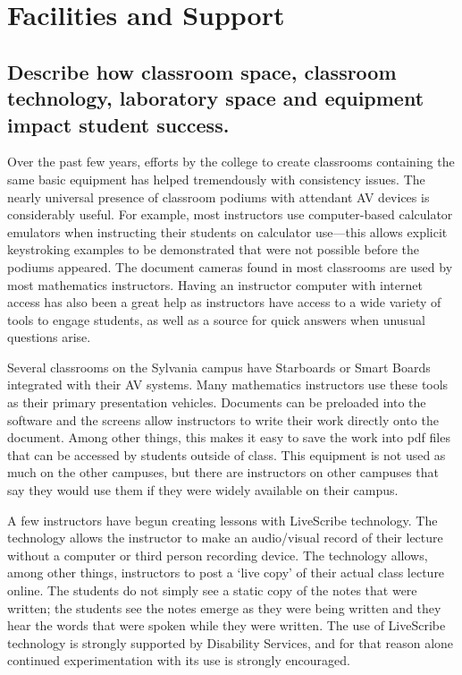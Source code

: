 \chapter{Facilities and Support}
\section{Describe how classroom space, classroom technology, laboratory space and equipment impact student success.}

Over the past few years, efforts by the college to create classrooms containing the same basic equipment has helped tremendously with consistency issues.  The nearly universal presence of classroom podiums with attendant AV devices is considerably useful.  For example, most instructors use computer-based calculator emulators when instructing their students on calculator use---this allows explicit keystroking examples to be demonstrated that were not possible before the podiums appeared.  The document cameras found in most classrooms are used by most mathematics instructors.     Having an instructor computer with internet access has also been a great help as instructors have access to a wide variety of tools to engage students, as well as a source for quick answers when unusual questions arise.  

Several classrooms on the Sylvania campus have Starboards  or Smart Boards integrated with their AV systems.  Many mathematics instructors use these tools as their primary presentation vehicles.  Documents can be preloaded into the software and the screens allow instructors to write their work directly onto the document.  Among other things, this makes it easy to save the work into pdf files that can be accessed by students outside of class.  This equipment is not used as much on the other campuses, but there are instructors on other campuses that say they would use them if they were widely available on their campus.

A few instructors have begun creating lessons with LiveScribe technology.  The technology allows the instructor to make an audio/visual record of their lecture without a computer or third person recording device.  The technology allows, among other things, instructors to post a `live copy' of their actual class lecture online.  The students  do not simply see a static copy of the notes that were written;  the students see the notes emerge as they were being written and they hear the words that were spoken while they were written.  The use of LiveScribe technology is strongly supported by Disability Services, and for that reason alone continued experimentation with its use is strongly encouraged.

